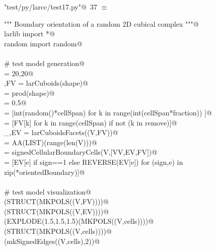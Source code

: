 \documentclass[11pt,oneside]{article}	%
\begin{document}
\begin{flushleft} \small \label{scrap59}
\protect{}\verb@"test/py/larcc/test17.py"@\nobreak\ {\footnotesize 37 }$\equiv$
\vspace{-1ex}
\begin{list}{}{} \item
\mbox{}\verb@""" Boundary orientation of a random 2D cubical complex """@\\
\mbox{}\verb@from larlib import *@\\
\mbox{}\verb@from random import random@\\
\mbox{}\verb@@\\
\mbox{}\verb@# test model generation@\\
\mbox{}\verb@shape = 20,20@\\
\mbox{}\verb@V,FV = larCuboids(shape)@\\
\mbox{}\verb@cellSpan = prod(shape)@\\
\mbox{}\verb@fraction = 0.5@\\
\mbox{}\verb@remove = [int(random()*cellSpan) for k in range(int(cellSpan*fraction)) ]@\\
\mbox{}\verb@FV = [FV[k] for k in range(cellSpan) if not (k in remove)]@\\
\mbox{}\verb@_,EV = larCuboidsFacets((V,FV))@\\
\mbox{}\verb@VV = AA(LIST)(range(len(V)))@\\
\mbox{}\verb@orientedBoundary = signedCellularBoundaryCells(V,[VV,EV,FV])@\\
\mbox{}\verb@cells = [EV[e] if sign==1 else REVERSE(EV[e]) for (sign,e) in zip(*orientedBoundary)]@\\
\mbox{}\verb@@\\
\mbox{}\verb@# test model visualization@\\
\mbox{}\verb@VIEW(STRUCT(MKPOLS((V,FV))))@\\
\mbox{}\verb@VIEW(STRUCT(MKPOLS((V,EV))))@\\
\mbox{}\verb@VIEW(EXPLODE(1.5,1.5,1.5)(MKPOLS((V,cells))))@\\
\mbox{}\verb@VIEW(STRUCT(MKPOLS((V,cells))))@\\
\mbox{}\verb@VIEW(mkSignedEdges((V,cells),2))@\\
\mbox{}\verb@@{\NWsep}
\end{list}
\vspace{-2ex}
\end{flushleft}
\end{document}
